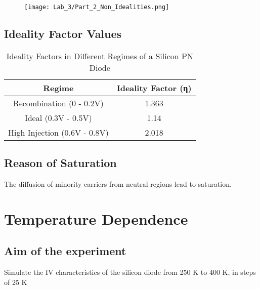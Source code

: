 \documentclass[a4paper]{article}
\begin{document}
\begin{figure}[h!]
    \centering
    \texttt{[image: Lab\_3/Part\_2\_Non\_Idealities.png]}
\end{figure}

\newpage

\subsection{Ideality Factor Values}
\begin{table}[h!]
    \centering
    \begin{tabular}{|c|c|}
    \hline
    \textbf{Regime}       & \textbf{Ideality Factor (η)} \\ \hline
    Recombination (0 - 0.2V) & 1.363 \\ \hline
    Ideal (0.3V - 0.5V)       & 1.14  \\ \hline
    High Injection (0.6V - 0.8V) & 2.018 \\ \hline
    \end{tabular}
    \caption{Ideality Factors in Different Regimes of a Silicon PN Diode}
    \label{tab:ideality_factors}
\end{table}


\subsection{Reason of Saturation}
The diffusion of minority carriers from neutral regions lead to saturation.




















\newpage
\section{Temperature Dependence}
\subsection{Aim of the experiment}
Simulate the IV characteristics of the silicon diode from 250 K to 400 K, in steps of 25 K
\end{document}
